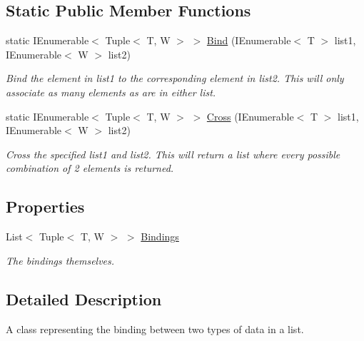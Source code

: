 \subsection*{Static Public Member Functions}
\begin{DoxyCompactItemize}
\item 
static I\+Enumerable$<$ Tuple$<$ T, W $>$ $>$ \hyperlink{classHumDrum_1_1Structures_1_1BindingsTable_a5ed4c4ae793ad93b7af82df42c70bb0a}{Bind} (I\+Enumerable$<$ T $>$ list1, I\+Enumerable$<$ W $>$ list2)
\begin{DoxyCompactList}\small\item\em Bind the element in list1 to the corresponding element in list2. This will only associate as many elements as are in either list. \end{DoxyCompactList}\item 
static I\+Enumerable$<$ Tuple$<$ T, W $>$ $>$ \hyperlink{classHumDrum_1_1Structures_1_1BindingsTable_a4d34b2fdbfa7d3ab5d32f0e3acc3b0b4}{Cross} (I\+Enumerable$<$ T $>$ list1, I\+Enumerable$<$ W $>$ list2)
\begin{DoxyCompactList}\small\item\em Cross the specified list1 and list2. This will return a list where every possible combination of 2 elements is returned. \end{DoxyCompactList}\end{DoxyCompactItemize}
\subsection*{Properties}
\begin{DoxyCompactItemize}
\item 
List$<$ Tuple$<$ T, W $>$ $>$ \hyperlink{classHumDrum_1_1Structures_1_1BindingsTable_af75d299aa8cede939a0b5f0b24244750}{Bindings}
\begin{DoxyCompactList}\small\item\em The bindings themselves. \end{DoxyCompactList}\end{DoxyCompactItemize}


\subsection{Detailed Description}
A class representing the binding between two types of data in a list. 



